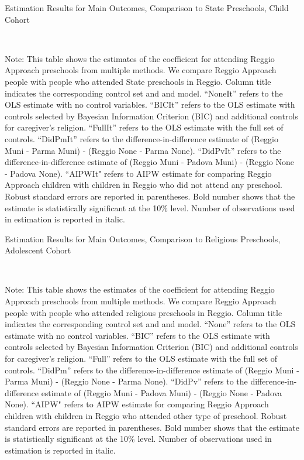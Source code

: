 \begin{table}[H] \caption{Estimation Results for Main Outcomes, Comparison to State Preschools, Child Cohort} \label{ols-M-child-reg-state}
\scalebox{0.8}{}
\vspace{1ex} \\
\footnotesize\raggedright{Note: This table shows the estimates of the coefficient for attending Reggio Approach preschools from multiple methods. We compare Reggio Approach people with people who attended State preschools in Reggio. Column title indicates the corresponding control set and and model. ``NoneIt'' refers to the OLS estimate with no control variables. ``BICIt'' refers to the OLS estimate with controls selected by Bayesian Information Criterion (BIC) and additional controls for caregiver's religion. ``FullIt'' refers to the OLS estimate with the full set of controls. ``DidPmIt'' refers to the difference-in-difference estimate of (Reggio Muni - Parma Muni) - (Reggio None - Parma None). ``DidPvIt'' refers to the difference-in-difference estimate of (Reggio Muni - Padova Muni) - (Reggio None - Padova None). ``AIPWIt" refers to AIPW estimate for comparing Reggio Approach children with children in Reggio who did not attend any preschool. Robust standard errors are reported in parentheses. Bold number shows that the estimate is statistically significant at the 10\% level. Number of observations used in estimation is reported in italic.}

\end{table}


\begin{table}[H] \caption{Estimation Results for Main Outcomes, Comparison to Religious Preschools, Adolescent Cohort} \label{ols-M-adol-reg-reli}
\scalebox{0.8}{}
\vspace{1ex} \\
\footnotesize\raggedright{Note: This table shows the estimates of the coefficient for attending Reggio Approach preschools from multiple methods. We compare Reggio Approach people with people who attended religious preschools in Reggio. Column title indicates the corresponding control set and and model. ``None'' refers to the OLS estimate with no control variables. ``BIC'' refers to the OLS estimate with controls selected by Bayesian Information Criterion (BIC) and additional controls for caregiver's religion. ``Full'' refers to the OLS estimate with the full set of controls. ``DidPm'' refers to the difference-in-difference estimate of (Reggio Muni - Parma Muni) - (Reggio None - Parma None). ``DidPv'' refers to the difference-in-difference estimate of (Reggio Muni - Padova Muni) - (Reggio None - Padova None). ``AIPW" refers to AIPW estimate for comparing Reggio Approach children with children in Reggio who attended other type of preschool. Robust standard errors are reported in parentheses. Bold number shows that the estimate is statistically significant at the 10\% level. Number of observations used in estimation is reported in italic.}
\end{table}


